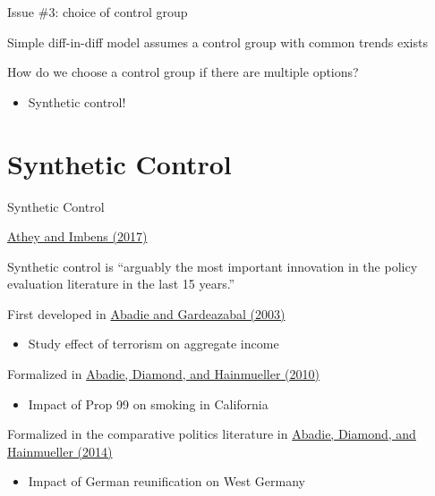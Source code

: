 \documentclass[compress, 8pt]{beamer}
\begin{document}
\begin{frame}{Issue \#3: choice of control group}

Simple diff-in-diff model assumes a control group with common trends exists

\vspace{3ex}
How do we choose a control group if there are multiple options?
\begin{itemize}
    \item Synthetic control!
\end{itemize}

\end{frame}



\section[Synthetic Control]{Synthetic Control}
\miniframesoff
\begin{frame}
    \tableofcontents[currentsection]
\end{frame}
\miniframeson


\begin{frame}{Synthetic Control}

\href{https://pubs.aeaweb.org/doi/pdfplus/10.1257/jep.31.2.3}{Athey and Imbens (2017)}
\begin{displayquote}[pg. 3]
Synthetic control is ``arguably the most important innovation in the policy evaluation literature in the last 15 years.''
\end{displayquote}

\vspace{2ex}
First developed in \href{https://www.aeaweb.org/articles?id=10.1257/000282803321455188}{Abadie and Gardeazabal (2003)}
\begin{itemize}
    \item Study effect of terrorism on aggregate income
\end{itemize}

\vspace{2ex}
Formalized in \href{https://www.jstor.org/stable/29747059?seq=1}{Abadie, Diamond, and Hainmueller (2010)}
\begin{itemize}
    \item Impact of Prop 99 on smoking in California
\end{itemize}

\vspace{2ex}
Formalized in the comparative politics literature in \href{https://onlinelibrary.wiley.com/doi/abs/10.1111/ajps.12116}{Abadie, Diamond, and Hainmueller (2014)}
\begin{itemize}
    \item Impact of German reunification on West Germany
\end{itemize}


\end{frame}
\end{document}
